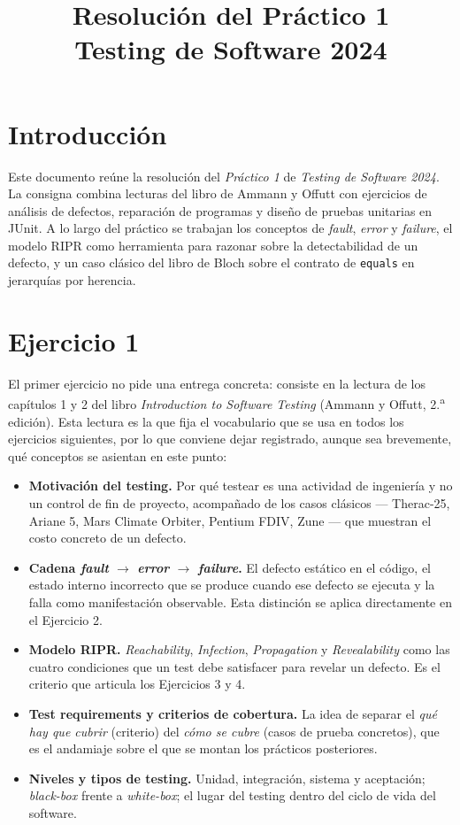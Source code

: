\documentclass[12pt,a4paper]{article}
\title{\textbf{Resolución del Práctico 1}\\Testing de Software 2024}
\author{}
\date{}
\begin{document}
\maketitle
\tableofcontents
\newpage

\section*{Introducción}
Este documento reúne la resolución del \textit{Práctico 1} de \textit{Testing de Software 2024}. La consigna combina lecturas del libro de Ammann y Offutt con ejercicios de análisis de defectos, reparación de programas y diseño de pruebas unitarias en JUnit. A lo largo del práctico se trabajan los conceptos de \textit{fault}, \textit{error} y \textit{failure}, el modelo RIPR como herramienta para razonar sobre la detectabilidad de un defecto, y un caso clásico del libro de Bloch sobre el contrato de \texttt{equals} en jerarquías por herencia.

\section{Ejercicio 1}
El primer ejercicio no pide una entrega concreta: consiste en la lectura de los capítulos 1 y 2 del libro \textit{Introduction to Software Testing} (Ammann y Offutt, 2.\textsuperscript{a} edición). Esta lectura es la que fija el vocabulario que se usa en todos los ejercicios siguientes, por lo que conviene dejar registrado, aunque sea brevemente, qué conceptos se asientan en este punto:

\begin{itemize}
  \item \textbf{Motivación del testing.} Por qué testear es una actividad de ingeniería y no un control de fin de proyecto, acompañado de los casos clásicos --- Therac-25, Ariane 5, Mars Climate Orbiter, Pentium FDIV, Zune --- que muestran el costo concreto de un defecto.
  \item \textbf{Cadena \textit{fault} $\rightarrow$ \textit{error} $\rightarrow$ \textit{failure}.} El defecto estático en el código, el estado interno incorrecto que se produce cuando ese defecto se ejecuta y la falla como manifestación observable. Esta distinción se aplica directamente en el Ejercicio 2.
  \item \textbf{Modelo RIPR.} \textit{Reachability}, \textit{Infection}, \textit{Propagation} y \textit{Revealability} como las cuatro condiciones que un test debe satisfacer para revelar un defecto. Es el criterio que articula los Ejercicios 3 y 4.
  \item \textbf{Test requirements y criterios de cobertura.} La idea de separar el \textit{qué hay que cubrir} (criterio) del \textit{cómo se cubre} (casos de prueba concretos), que es el andamiaje sobre el que se montan los prácticos posteriores.
  \item \textbf{Niveles y tipos de testing.} Unidad, integración, sistema y aceptación; \textit{black-box} frente a \textit{white-box}; el lugar del testing dentro del ciclo de vida del software.
\end{itemize}
\end{document}

